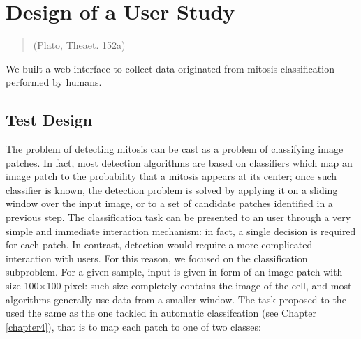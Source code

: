 \chapter{Design of a User Study}
\label{chapter5}
\thispagestyle{empty}

\begin{quotation}
{\footnotesize
{}
\begin{flushright}
(Plato, Theaet. 152a)
\end{flushright}
}
\end{quotation}

We built a web interface to collect data originated from mitosis classification performed by humans.


\vspace{0.5cm}


\section{Test Design}

The problem of detecting mitosis can be cast as a problem of classifying image
patches. In fact, most detection algorithms are based on classifiers which map
an image patch to the probability that a mitosis appears at its center; once such
classifier is known, the detection problem is solved by applying it on a sliding
window over the input image, or to a set of candidate patches identified in a
previous step.
The classification task can be presented to an user through a very simple and immediate interaction mechanism: in fact, a single decision is required for each
patch. In contrast, detection would require a more complicated interaction with
users. For this reason, we focused on the classification subproblem.
For a given sample, input is given in form of an image patch with size 100$\times$100 pixel: such size completely contains the image of the cell, and most algorithms
generally use data from a smaller window. The task proposed to the used the same as the one tackled in automatic classifcation (see Chapter \ref{chapter4}), that is to map each patch to one of two classes:

